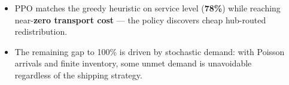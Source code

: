 \documentclass[
  a0paper,
  portrait,
  margin=0pt,
  colspace=24pt,
  blockverticalspace=24pt,
  innermargin=40pt,
  fontscale=2.38
]{tikzposter}
\begin{document}
\begin{columns}
{\begin{center}
\end{center}

\begin{itemize}
\item PPO matches the greedy heuristic on service level (\textbf{78\%}) while reaching near-\textbf{zero transport cost} --- the policy discovers cheap hub-routed redistribution.
\item The remaining gap to 100\% is driven by stochastic demand: with Poisson arrivals and finite inventory, some unmet demand is unavoidable regardless of the shipping strategy.
\end{itemize}
}

\end{columns}
\end{document}
